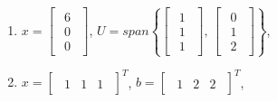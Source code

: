 \documentclass{article}
\begin{document}
\begin{enumerate}
\begin{enumerate}
            \item $x = \begin{bmatrix}\begin{array}{r} 6 \\ 0 \\ 0 \end{array}\end{bmatrix}$, $U = span \left\{ \begin{bmatrix}\begin{array}{r} 1 \\ 1\\ 1\end{array}\end{bmatrix},\, \begin{bmatrix}\begin{array}{r} 0 \\ 1\\ 2\end{array}\end{bmatrix} \right\}$,
            \item $x = \begin{bmatrix}\begin{array}{rrr} 1 & 1 & 1 \end{array}\end{bmatrix}^{T}$, $b = \begin{bmatrix}\begin{array}{rrr} 1 & 2 & 2 \end{array}\end{bmatrix}^{T}$,         
        \end{enumerate}


\end{enumerate}
\end{document}
